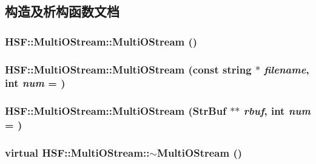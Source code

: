 \subsection{构造及析构函数文档}
\hypertarget{classHSF_1_1MultiOStream_aa480e0d213e42b0c566a3dfb508910b6}{
\subsubsection[{MultiOStream}]{\setlength{\rightskip}{0pt plus 5cm}HSF::MultiOStream::MultiOStream ()}}
\label{classHSF_1_1MultiOStream_aa480e0d213e42b0c566a3dfb508910b6}
\hypertarget{classHSF_1_1MultiOStream_a438ace99909dfb8edeb030fee3e389fd}{
\subsubsection[{MultiOStream}]{\setlength{\rightskip}{0pt plus 5cm}HSF::MultiOStream::MultiOStream (const string $\ast$ {\em filename}, \/  int {\em num} = {})}}
\label{classHSF_1_1MultiOStream_a438ace99909dfb8edeb030fee3e389fd}
\hypertarget{classHSF_1_1MultiOStream_a4aac510e4c446ac42c8439cb436f84a1}{
\subsubsection[{MultiOStream}]{\setlength{\rightskip}{0pt plus 5cm}HSF::MultiOStream::MultiOStream ({\bf StrBuf} $\ast$$\ast$ {\em rbuf}, \/  int {\em num} = {})}}
\label{classHSF_1_1MultiOStream_a4aac510e4c446ac42c8439cb436f84a1}
\hypertarget{classHSF_1_1MultiOStream_ae743ac2c5f62bb631f10e0efdf45c0a5}{
\subsubsection[{$\sim$MultiOStream}]{\setlength{\rightskip}{0pt plus 5cm}virtual HSF::MultiOStream::$\sim$MultiOStream ()}}

